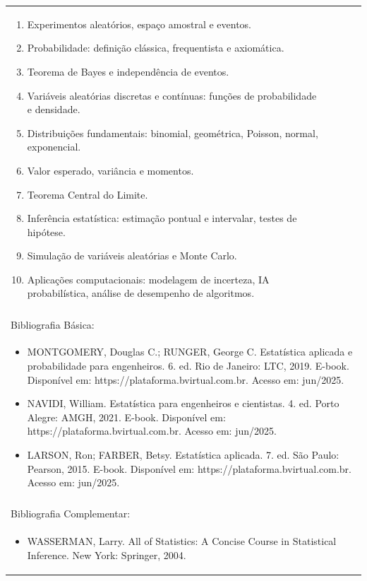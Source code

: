 \documentclass[11pt]{article}
\begin{document}
\begin{center}
\begin{longtable}{|p{4cm}|p{4cm}|p{4cm}|p{4cm}|}
{\begin{enumerate}
\item Experimentos aleatórios, espaço amostral e eventos.
\item Probabilidade: definição clássica, frequentista e axiomática.
\item Teorema de Bayes e independência de eventos.
\item Variáveis aleatórias discretas e contínuas: funções de probabilidade e densidade.
\item Distribuições fundamentais: binomial, geométrica, Poisson, normal, exponencial.
\item Valor esperado, variância e momentos.
\item Teorema Central do Limite.
\item Inferência estatística: estimação pontual e intervalar, testes de hipótese.
\item Simulação de variáveis aleatórias e Monte Carlo.
\item Aplicações computacionais: modelagem de incerteza, IA probabilística, análise de desempenho de algoritmos.\end{enumerate}}\\
\multicolumn{4}{|p{16cm}|}{}\\
\hline
\multicolumn{4}{|p{16cm}|}{Bibliografia Básica:}\\
\multicolumn{4}{|p{16cm}|}{%
\begin{itemize}\item MONTGOMERY, Douglas C.; RUNGER, George C. Estatística aplicada e probabilidade para engenheiros. 6. ed. Rio de Janeiro: LTC, 2019. E-book. Disponível em: https://plataforma.bvirtual.com.br. Acesso em: jun/2025.
\item NAVIDI, William. Estatística para engenheiros e cientistas. 4. ed. Porto Alegre: AMGH, 2021. E-book. Disponível em: https://plataforma.bvirtual.com.br. Acesso em: jun/2025.
\item LARSON, Ron; FARBER, Betsy. Estatística aplicada. 7. ed. São Paulo: Pearson, 2015. E-book. Disponível em: https://plataforma.bvirtual.com.br. Acesso em: jun/2025.\end{itemize}}\\
\multicolumn{4}{|p{16cm}|}{}\\
\hline
\multicolumn{4}{|p{16cm}|}{Bibliografia Complementar:}\\
\multicolumn{4}{|p{16cm}|}{%
\begin{itemize}\item WASSERMAN, Larry. All of Statistics: A Concise Course in Statistical Inference. New York: Springer, 2004.

\end{itemize}}
\end{longtable}
\end{center}
\end{document}
